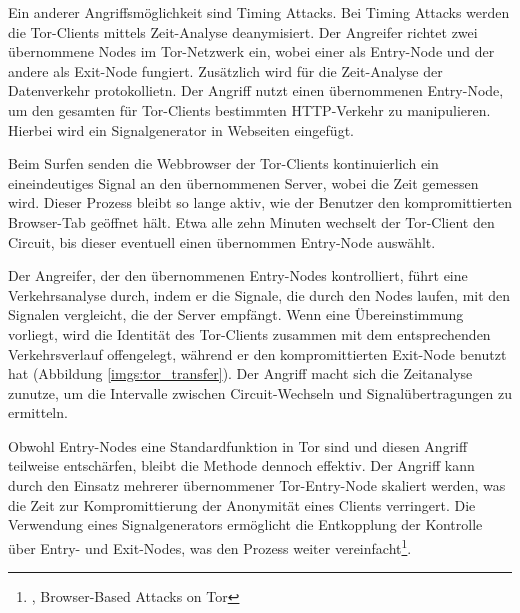 Ein anderer Angriffsmöglichkeit sind Timing Attacks. Bei Timing Attacks werden die Tor-Clients mittels Zeit-Analyse deanymisiert. Der Angreifer richtet zwei übernommene Nodes im Tor-Netzwerk ein, wobei einer als Entry-Node und der andere als Exit-Node fungiert. Zusätzlich wird für die Zeit-Analyse der Datenverkehr protokollietn. Der Angriff nutzt einen übernommenen Entry-Node, um den gesamten für Tor-Clients bestimmten HTTP-Verkehr zu manipulieren. Hierbei wird ein Signalgenerator in Webseiten eingefügt.

Beim Surfen senden die Webbrowser der Tor-Clients kontinuierlich ein eineindeutiges Signal an den übernommenen Server, wobei die Zeit gemessen wird. Dieser Prozess bleibt so lange aktiv, wie der Benutzer den kompromittierten Browser-Tab geöffnet hält. Etwa alle zehn Minuten wechselt der Tor-Client den Circuit, bis dieser eventuell einen übernommen Entry-Node auswählt.

Der Angreifer, der den übernommenen Entry-Nodes kontrolliert, führt eine Verkehrsanalyse durch, indem er die Signale, die durch den Nodes laufen, mit den Signalen vergleicht, die der Server empfängt. Wenn eine Übereinstimmung vorliegt, wird die Identität des Tor-Clients zusammen mit dem entsprechenden Verkehrsverlauf offengelegt, während er den kompromittierten Exit-Node benutzt hat (Abbildung \ref{imgs:tor_transfer}). Der Angriff macht sich die Zeitanalyse zunutze, um die Intervalle zwischen Circuit-Wechseln und Signalübertragungen zu ermitteln.

Obwohl Entry-Nodes eine Standardfunktion in Tor sind und diesen Angriff teilweise entschärfen, bleibt die Methode dennoch effektiv. Der Angriff kann durch den Einsatz mehrerer übernommener Tor-Entry-Node skaliert werden, was die Zeit zur Kompromittierung der Anonymität eines Clients verringert. Die Verwendung eines Signalgenerators ermöglicht die Entkopplung der Kontrolle über Entry- und Exit-Nodes, was den Prozess weiter vereinfacht\footnote{\cite{BrowserBasedAttacksOnTor}, Browser-Based Attacks on Tor}.
